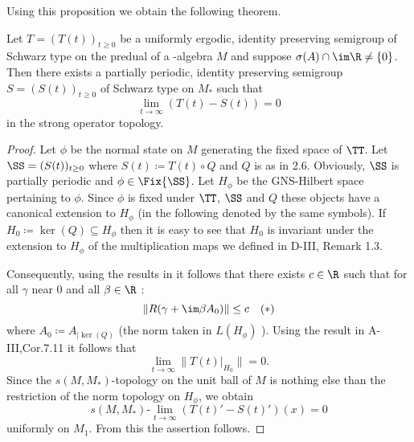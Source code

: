 Using this proposition we obtain the following theorem.
\begin{theorem}\label{thm:d4-3.11}
Let $ T = (T(t))_{t \geq 0} $  be a uniformly ergodic, identity preserving semigroup of Schwarz type on the predual of a \WA-algebra $ M $  and suppose $ \sigma(A) \cap \im\R \neq \{0\} $.
Then there exists a partially periodic, identity preserving semigroup $ S = (S(t))_{t \geq 0} $  of Schwarz type on $ M_{*} $  such that
\[
\lim_{t \to \infty} (T(t) - S(t)) = 0
\]
in the strong operator topology.
\end{theorem}
\begin{proof}
Let $ \phi $  be the normal state on $ M $  generating the fixed space of $ \TT $.
Let $ \SS = (S(t))_{t \geq 0} $  where $ S(t) \coloneqq T(t) \circ Q $  and $ Q $  is as in 2.6.
Obviously, $ \SS $  is partially periodic and $ \phi \in \Fix{\SS} $.
Let $ H_{\phi} $  be the GNS-Hilbert space pertaining to $ \phi $.
Since $ \phi $  is fixed under $ \TT $, $ \SS $  and $ Q $  these objects have a canonical extension to $ H_{\phi} $  (in the following denoted by the same symbols).
If $ H_{0} \coloneqq \ker(Q) \subseteq H_{\phi} $  then it is easy to see that $ H_{0} $  is invariant under the extension to $ H_{\phi} $  of the multiplication maps we defined in D-III, Remark 1.3.

Consequently, using the results in \citet{grohkümmerer:1982} it follows that there exists $ c \in \R $  such that for all $ \gamma $  near $ 0 $  and all $ \beta \in \R $ :
\[
\|R(\gamma + \im\beta A_{0})\| \leq c \quad (*)
\]
where $ A_{0} \coloneqq A_{|\ker(Q)} $  (the norm taken in $ L(H_{\phi}) $ ).
Using the result in A-III,Cor.7.11 it follows that
\[
\lim_{t \to \infty} \|T(t)|_{H_{0}}\| = 0.
\]
Since the $ s(M,M_{*}) $-topology on the unit ball of $ M $  is nothing else than the restriction of the norm topology on $ H_{\phi} $, we obtain
\[
s(M,M_{*})\text{-}\lim_{t \to \infty} (T(t)' - S(t)')(x) = 0
\]
uniformly on $ M_{1} $.
From this the assertion follows.
\end{proof}
